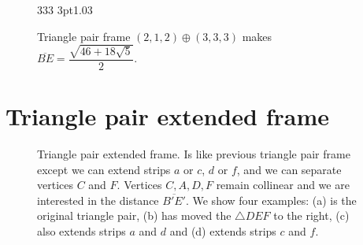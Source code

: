 \documentclass[11pt]{article}
\begin{document}
\begin{figure}[H]
\centering
\begin{center}
 {3}{3}{3} {3pt}{1.0}{3} %
\end{center}
\caption{Triangle pair frame $(2,1,2) \oplus (3,3,3)$ makes $\overline{BE} = \dfrac{\sqrt{46+18\sqrt{5}}}{2}$.}
\label{fig:tripair212333}
\end{figure}

\section{Triangle pair extended frame}

\begin{figure}[H]
 \centering
 \caption{Triangle pair extended frame. Is like previous triangle pair frame except
 we can extend strips $a$ or $c$, $d$ or $f$, and we can separate vertices $C$ and $F$.
 Vertices $C,A,D,F$ remain collinear and we are interested in the distance $\overline{B'E'}$.
 We show four examples: (a) is the original triangle pair,
 (b) has moved the $\triangle{DEF}$ to the right,
 (c) also extends strips $a$ and $d$ and (d) extends strips $c$ and $f$.
 }
 \label{fig:tripairext}
\end{figure}
\end{document}
